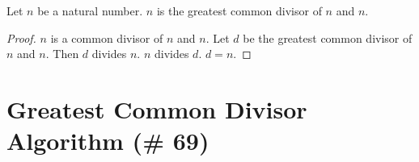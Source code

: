 \documentclass{article}
\begin{document}
\begin{forthel}
\begin{lemma}
Let $n$ be a natural number.
$n$ is the greatest common divisor of $n$ and $n$.
\end{lemma}
\begin{proof}
$n$ is a common divisor of $n$ and $n$. Let $d$ be the greatest common divisor of $n$ and $n$.
Then $d$ divides $n$. $n$ divides $d$. $d = n$.
\end{proof}

\end{forthel}



\section{Greatest Common Divisor Algorithm (\# 69)}
\end{document}
